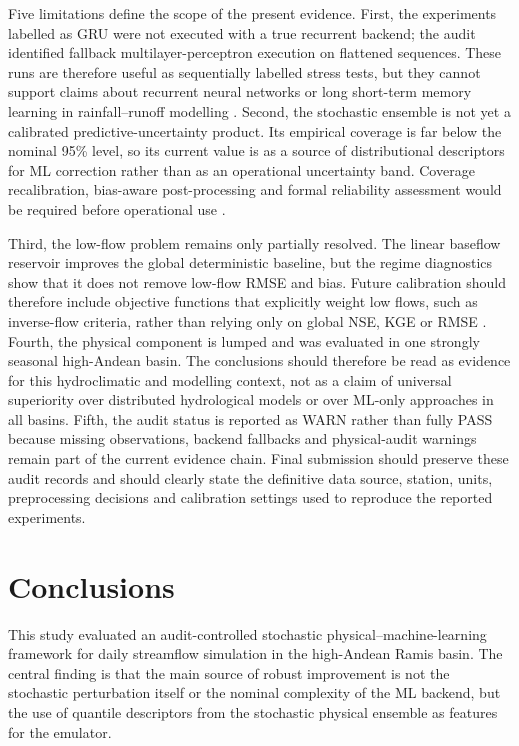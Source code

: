 \documentclass[a4paper,fleqn]{cas-sc}
\begin{document}
Five limitations define the scope of the present evidence. First, the
experiments labelled as GRU were not executed with a true recurrent
backend; the audit identified fallback multilayer-perceptron execution
on flattened sequences. These runs are therefore useful as sequentially
labelled stress tests, but they cannot support claims about recurrent
neural networks or long short-term memory learning in rainfall--runoff
modelling \citep{kratzert2018rainfall}. Second, the stochastic ensemble
is not yet a calibrated predictive-uncertainty product. Its empirical
coverage is far below the nominal 95\% level, so its current value is as
a source of distributional descriptors for ML correction rather than as
an operational uncertainty band. Coverage recalibration, bias-aware
post-processing and formal reliability assessment would be required
before operational use \citep{thiboult2016accounting}.

Third, the low-flow problem remains only partially resolved. The linear
baseflow reservoir improves the global deterministic baseline, but the
regime diagnostics show that it does not remove low-flow RMSE and bias.
Future calibration should therefore include objective functions that
explicitly weight low flows, such as inverse-flow criteria, rather than
relying only on global NSE, KGE or RMSE \citep{pushpalatha2012review}.
Fourth, the physical component is lumped and was evaluated in one
strongly seasonal high-Andean basin. The conclusions should therefore be
read as evidence for this hydroclimatic and modelling context, not as a
claim of universal superiority over distributed hydrological models or
over ML-only approaches in all basins. Fifth, the audit status is
reported as WARN rather than fully PASS because missing observations,
backend fallbacks and physical-audit warnings remain part of the
current evidence chain. Final submission should preserve these audit
records and should clearly state the definitive data source, station,
units, preprocessing decisions and calibration settings used to
reproduce the reported experiments.

\section{Conclusions}\label{sec:conclusions}

This study evaluated an audit-controlled stochastic
physical--machine-learning framework for daily streamflow simulation in
the high-Andean Ramis basin. The central finding is that the main source
of robust improvement is not the stochastic perturbation itself or the
nominal complexity of the ML backend, but the use of quantile
descriptors from the stochastic physical ensemble as features for the
emulator.
\end{document}
